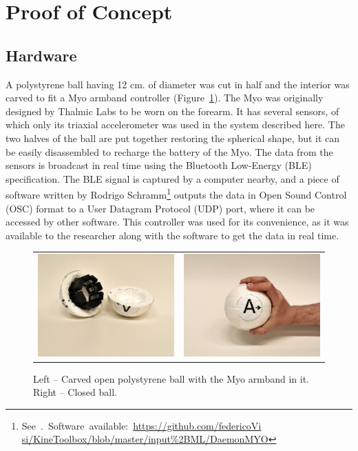 \documentclass{nime-alternate_ADJ} %
\begin{document}
\section{Proof of Concept}

\subsection{Hardware}

A polystyrene ball having 12 cm. of diameter was cut in half and the interior was carved to fit a Myo armband controller (Figure~\ref{fig_2}). The Myo was originally designed by Thalmic Labs to be worn on the forearm. It has several sensors, of which only its triaxial accelerometer was used in the system described here. The two halves of the ball are put together restoring the spherical shape, but it can be easily disassembled to recharge the battery of the Myo. The data from the sensors is broadcast in real time using the Bluetooth Low-Energy (BLE) specification. The BLE signal is captured by a computer nearby, and a piece of software written by Rodrigo Schramm\footnote{See~\cite{Visi_2017}.~Software~available:~\href{https://github.com/federicoVisi/KineToolbox/blob/master/input\%2BML/DaemonMYO}{https://github.com/federicoVi\\si/KineToolbox/blob/master/input\%2BML/DaemonMYO}} outputs the data in Open Sound Control (OSC) format to a User Datagram Protocol (UDP) port, where it can be accessed by other software. This controller was used for its convenience, as it was available to the researcher along with the software to get the data in real time.

\begin{figure}[t!]
   \setlength\tabcolsep{2pt} 
    \begin{tabular}{cc}
        \includegraphics[trim={10cm 24cm 10cm 6cm}, clip=true, width=0.48\columnwidth]{ball_open}
        &
        \includegraphics[trim={20cm 15cm 0cm 15cm}, clip=true, width=0.48\columnwidth]{ball_handheld}
    \end{tabular}
	\caption{Left -- Carved open polystyrene ball with the Myo armband in it. Right -- Closed ball.}
	\label{fig_2}
\end{figure}
\end{document}
